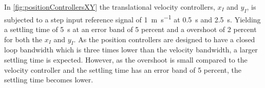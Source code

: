\begin{minipage}{\linewidth}
\begin{minipage}{0.5\linewidth}
\begin{figure}[H]
            \centering
            \label{fig:velocityControllersXYAction}
        \end{figure}
    \end{minipage}
\end{minipage}

In \autoref{fig:positionControllersXY} the translational velocity controllers, $x_I$ and $y_I$, is subjected to a step input reference signal of \SI{1}{m s^{-1}} at \SI{0.5}{s} and \SI{2.5}{s}. Yielding a settling time of \SI{5}{s} at an error band of 5 percent and a overshoot of 2 percent for both the $x_I$ and $y_I$. As the position controllers are designed to have a closed loop bandwidth which is three times lower than the velocity bandwidth, a larger settling time is expected. However, as the overshoot is small compared to the velocity controller and the settling time has an error band of 5 percent, the settling time becomes lower.

